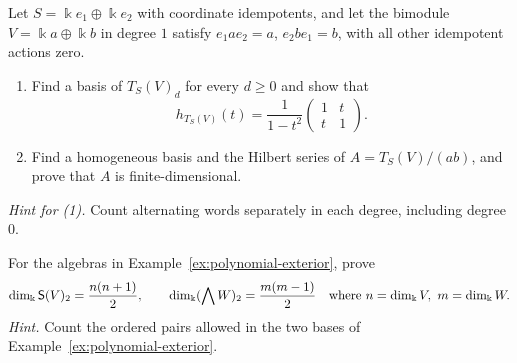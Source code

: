 \begin{exercise}
Let $S=\Bbbk e_1\oplus\Bbbk e_2$ with coordinate idempotents, and let the bimodule $V=\Bbbk a\oplus\Bbbk b$ in degree $1$ satisfy $e_1ae_2=a$, $e_2be_1=b$, with all other idempotent actions zero.
\begin{enumerate}
\item Find a basis of $T_S(V)_d$ for every $d\geq0$ and show that
\[
h_{T_S(V)}(t)=\frac{1}{1-t^2}\begin{pmatrix}1&t\\t&1\end{pmatrix}.
\]
\item Find a homogeneous basis and the Hilbert series of $A=T_S(V)/(ab)$, and prove that $A$ is finite-dimensional.
\end{enumerate}
\emph{Hint for (1).} Count alternating words separately in each degree, including degree $0$.
\end{exercise}

\begin{exercise}
For the algebras in Example~\ref{ex:polynomial-exterior}, prove
\[
\dim_\Bbbk\mathsf{S}(V)_2=\frac{n(n+1)}2,\qquad
\dim_\Bbbk(\bigwedge W)_2=\frac{m(m-1)}2
\quad\text{where }n=\dim_\Bbbk V,\ m=\dim_\Bbbk W.
\]
\emph{Hint.} Count the ordered pairs allowed in the two bases of Example~\ref{ex:polynomial-exterior}.
\end{exercise}

\pagebreak

